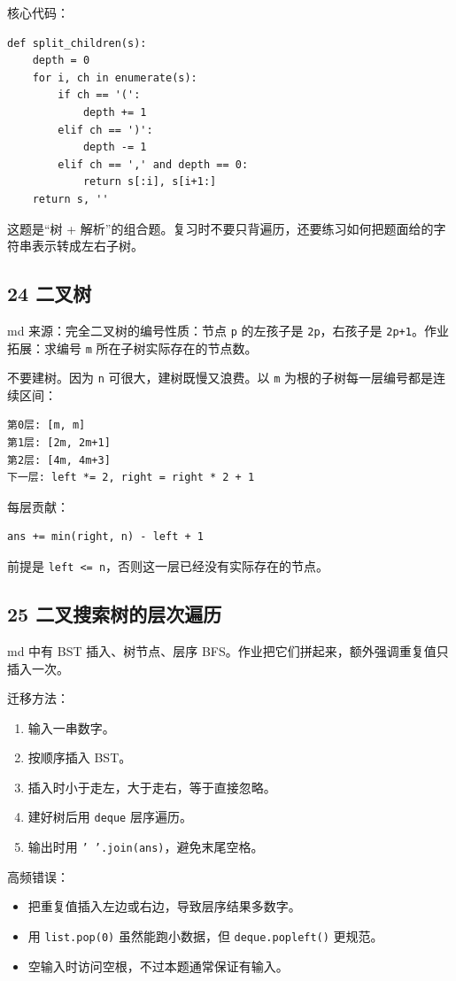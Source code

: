 \documentclass[10pt,a4paper,fontset=none]{ctexart}
\begin{document}
核心代码：
\begin{lstlisting}[style=py]
def split_children(s):
    depth = 0
    for i, ch in enumerate(s):
        if ch == '(':
            depth += 1
        elif ch == ')':
            depth -= 1
        elif ch == ',' and depth == 0:
            return s[:i], s[i+1:]
    return s, ''
\end{lstlisting}

这题是“树 + 解析”的组合题。复习时不要只背遍历，还要练习如何把题面给的字符串表示转成左右子树。

\subsection{24 二叉树}
\begin{focusbox}
md 来源：完全二叉树的编号性质：节点 \texttt{p} 的左孩子是 \texttt{2p}，右孩子是 \texttt{2p+1}。作业拓展：求编号 \texttt{m} 所在子树实际存在的节点数。
\end{focusbox}

不要建树。因为 \texttt{n} 可很大，建树既慢又浪费。以 \texttt{m} 为根的子树每一层编号都是连续区间：
\begin{lstlisting}[style=plain]
第0层: [m, m]
第1层: [2m, 2m+1]
第2层: [4m, 4m+3]
下一层: left *= 2, right = right * 2 + 1
\end{lstlisting}

每层贡献：
\begin{lstlisting}[style=py]
ans += min(right, n) - left + 1
\end{lstlisting}
前提是 \texttt{left <= n}，否则这一层已经没有实际存在的节点。

\subsection{25 二叉搜索树的层次遍历}
md 中有 BST 插入、树节点、层序 BFS。作业把它们拼起来，额外强调重复值只插入一次。

迁移方法：
\begin{enumerate}
  \item 输入一串数字。
  \item 按顺序插入 BST。
  \item 插入时小于走左，大于走右，等于直接忽略。
  \item 建好树后用 \texttt{deque} 层序遍历。
  \item 输出时用 \texttt{' '.join(ans)}，避免末尾空格。
\end{enumerate}

高频错误：
\begin{itemize}
  \item 把重复值插入左边或右边，导致层序结果多数字。
  \item 用 \texttt{list.pop(0)} 虽然能跑小数据，但 \texttt{deque.popleft()} 更规范。
  \item 空输入时访问空根，不过本题通常保证有输入。
\end{itemize}
\end{document}
